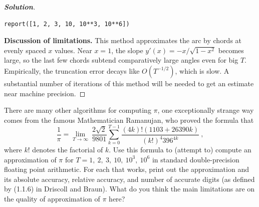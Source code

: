 \documentclass[11pt]{article}
\newenvironment{problem}[2][Question]{\begin{trivlist}
\item[\hskip \labelsep {\bfseries #1}\hskip \labelsep {\bfseries #2.}]}{\end{trivlist}}
\newenvironment{spacedproof}[1][\proofname]{%
  \begin{proof}[\textbf{#1}]$ $\par\nobreak\ignorespaces
}{%
  \end{proof}
}
\theoremstyle{definition}
\begin{document}
\begin{spacedproof}[Solution]
\begin{lstlisting}
report([1, 2, 3, 10, 10**3, 10**6])
\end{lstlisting}

\textbf{Discussion of limitations.}
This method approximates the arc by chords at evenly spaced $x$ values. Near $x=1$, the slope $y'(x) = -x/\sqrt{1-x^2}$ becomes large, so the last few chords subtend comparatively large angles even for big $T$. Empirically, the truncation error decays like $O(T^{-1/2})$, which is slow. A substantial number of iterations of this method will be needed to get an estimate near machine precision.
\end{spacedproof}


\newpage

\begin{problem}{3}
There are many other algorithms for computing $\pi$, one exceptionally strange way comes from the famous Mathematician Ramanujan, who proved the formula that
$$ \frac {1}{\pi }= \lim_{T\rightarrow \infty} \ {\frac {2{\sqrt {2}}}{9801}}\sum _{k=0}^{T-1}{\frac {(4k)!(1103+26390k)}{(k!)^{4}396^{4k}}} \ , $$
where $k!$ denotes the factorial of $k$. Use this formula to (attempt to) compute an approximation of $\pi$ for $T=1,\ 2,\ 3, \ 10,\ 10^3,\ 10^6$ in standard double-precision floating point arithmetic. For each that works, print out the approximation and its absolute accuracy, relative accuracy, and number of accurate digits (as defined by (1.1.6) in Driscoll and Braun). What do you think the main limitations are on the quality of approximation of $\pi$ here?
\end{problem}
\end{document}
